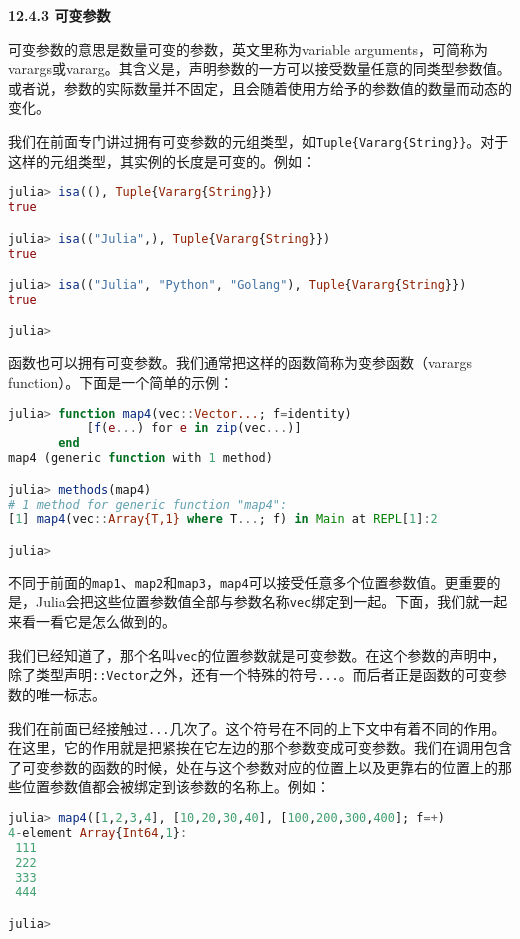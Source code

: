 \textbf{12.4.3 可变参数}

可变参数的意思是数量可变的参数，英文里称为variable arguments，可简称为varargs或vararg。其含义是，声明参数的一方可以接受数量任意的同类型参数值。或者说，参数的实际数量并不固定，且会随着使用方给予的参数值的数量而动态的变化。

我们在前面专门讲过拥有可变参数的元组类型，如\verb`Tuple{Vararg{String}}`。对于这样的元组类型，其实例的长度是可变的。例如：

\begin{lstlisting}[language=julia]
julia> isa((), Tuple{Vararg{String}})
true

julia> isa(("Julia",), Tuple{Vararg{String}})
true

julia> isa(("Julia", "Python", "Golang"), Tuple{Vararg{String}})
true

julia> 
\end{lstlisting}

函数也可以拥有可变参数。我们通常把这样的函数简称为变参函数（varargs function）。下面是一个简单的示例：

\begin{lstlisting}[language=julia]
julia> function map4(vec::Vector...; f=identity)
           [f(e...) for e in zip(vec...)]
       end
map4 (generic function with 1 method)

julia> methods(map4)
# 1 method for generic function "map4":
[1] map4(vec::Array{T,1} where T...; f) in Main at REPL[1]:2

julia>  
\end{lstlisting}

不同于前面的\verb`map1`、\verb`map2`和\verb`map3`，\verb`map4`可以接受任意多个位置参数值。更重要的是，Julia会把这些位置参数值全部与参数名称\verb`vec`绑定到一起。下面，我们就一起来看一看它是怎么做到的。

我们已经知道了，那个名叫\verb`vec`的位置参数就是可变参数。在这个参数的声明中，除了类型声明\verb`::Vector`之外，还有一个特殊的符号\verb`...`。而后者正是函数的可变参数的唯一标志。

我们在前面已经接触过\verb`...`几次了。这个符号在不同的上下文中有着不同的作用。在这里，它的作用就是把紧挨在它左边的那个参数变成可变参数。我们在调用包含了可变参数的函数的时候，处在与这个参数对应的位置上以及更靠右的位置上的那些位置参数值都会被绑定到该参数的名称上。例如：

\begin{lstlisting}[language=julia]
julia> map4([1,2,3,4], [10,20,30,40], [100,200,300,400]; f=+)
4-element Array{Int64,1}:
 111
 222
 333
 444

julia> 
\end{lstlisting}

